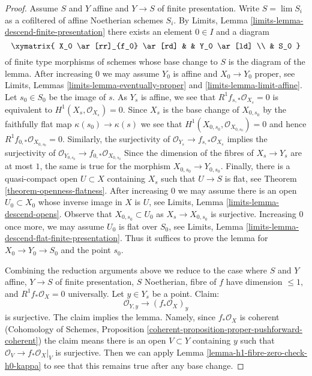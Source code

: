 \begin{proof}
\medskip\noindent
Assume $S$ and $Y$ affine and $Y \to S$ of finite presentation.
Write $S = \lim S_i$ as a cofiltered of affine Noetherian schemes $S_i$.
By Limits, Lemma \ref{limits-lemma-descend-finite-presentation}
there exists an element $0 \in I$ and a diagram
$$
\xymatrix{
X_0 \ar[rr]_{f_0} \ar[rd] & & Y_0 \ar[ld] \\
& S_0
}
$$
of finite type morphisms of schemes whose base change to $S$ is the
diagram of the lemma. After increasing $0$ we may assume $Y_0$
is affine and $X_0 \to Y_0$ proper, see
Limits, Lemmas \ref{limits-lemma-eventually-proper} and
\ref{limits-lemma-limit-affine}.
Let $s_0 \in S_0$ be the image of $s$.
As $Y_s$ is affine, we see that
$R^1f_{s,*}\mathcal{O}_{X_s} = 0$ is equivalent
to $H^1(X_s, \mathcal{O}_{X_s}) = 0$.
Since $X_s$ is the base change of $X_{0, s_0}$ by
the faithfully flat map $\kappa(s_0) \to \kappa(s)$
we see that $H^1(X_{0, s_0}, \mathcal{O}_{X_{0, s_0}}) = 0$
and hence $R^1f_{0, *}\mathcal{O}_{X_{0, s_0}} = 0$.
Similarly, the surjectivity of
$\mathcal{O}_{Y_s} \to f_{s, *}\mathcal{O}_{X_s}$
implies the surjectivity of
$\mathcal{O}_{Y_{0, s_0}} \to f_{0, *}\mathcal{O}_{X_{0, s_0}}$
Since the dimension of the fibres of $X_s \to Y_s$ are at most $1$,
the same is true for the morphism $X_{0, s_0} \to Y_{0, s_0}$.
Finally, there is a quasi-compact open $U \subset X$ containing
$X_s$ such that $U \to S$ is flat, see
Theorem \ref{theorem-openness-flatness}.
After increasing $0$ we may assume there is an open
$U_0 \subset X_0$ whose inverse image in $X$ is $U$, see
Limits, Lemma \ref{limits-lemma-descend-opens}.
Observe that $X_{0, s_0} \subset U_0$ as $X_s \to X_{0, s_0}$
is surjective.
Increasing $0$ once more, we may assume $U_0$ is flat over $S_0$, see
Limits, Lemma \ref{limits-lemma-descend-flat-finite-presentation}.
Thus it suffices to prove the lemma for
$X_0 \to Y_0 \to S_0$ and the point $s_0$.

\medskip\noindent
Combining the reduction arguments above we reduce to the case where
$S$ and $Y$ affine, $Y \to S$ of finite presentation, $S$ Noetherian,
fibre of $f$ have dimension $\leq 1$, and $R^1f_*\mathcal{O}_X = 0$
universally. Let $y \in Y_s$ be a point. Claim:
$$
\mathcal{O}_{Y, y} \longrightarrow (f_*\mathcal{O}_X)_y
$$
is surjective. The claim implies the lemma. Namely, since
$f_*\mathcal{O}_X$ is coherent (Cohomology of Schemes, Proposition
\ref{coherent-proposition-proper-pushforward-coherent})
the claim means there is an open $V \subset Y$ containing $y$
such that $\mathcal{O}_V \to f_*\mathcal{O}_X|_V$ is surjective.
Then we can apply Lemma \ref{lemma-h1-fibre-zero-check-h0-kappa}
to see that this remains true after any base change.


\end{proof}
